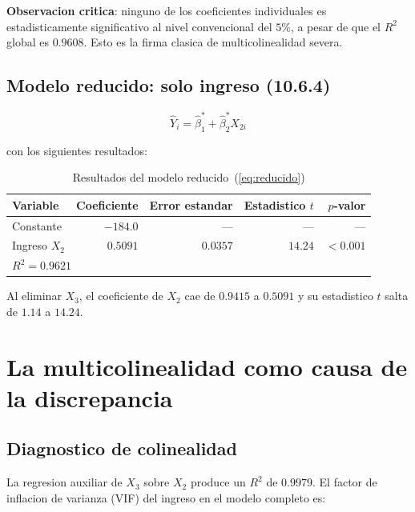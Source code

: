 \documentclass[12pt, letterpaper]{article}
\theoremstyle{remark}
\begin{document}
\noindent\textbf{Observacion critica}: ninguno de los coeficientes individuales
es estadisticamente significativo al nivel convencional del $5\%$, a pesar de
que el $R^2$ global es $0.9608$. Esto es la firma clasica de multicolinealidad
severa.

\subsection{Modelo reducido: solo ingreso (10.6.4)}

\begin{equation}
  \hat{Y}_i = \hat{\beta}_1^* + \hat{\beta}_2^* X_{2i}
  \label{eq:reducido}
\end{equation}

\noindent con los siguientes resultados:

\begin{table}[ht]
\centering
\caption{Resultados del modelo reducido~(\ref{eq:reducido})}
\label{tab:reducido}
\small
\begin{tabular}{lrrrr}
\toprule
\textbf{Variable} & \textbf{Coeficiente} & \textbf{Error estandar}
                  & \textbf{Estadistico $t$} & \textbf{$p$-valor} \\
\midrule
Constante         & $-184.0$  & ---      & ---     & ---    \\
Ingreso $X_2$     & $0.5091$  & $0.0357$ & $14.24$ & $< 0.001$ \\
\midrule
\multicolumn{2}{l}{$R^2 = 0.9621$} & \multicolumn{3}{l}{} \\
\bottomrule
\end{tabular}
\end{table}

\noindent Al eliminar $X_3$, el coeficiente de $X_2$ cae de $0.9415$ a
$0.5091$ y su estadistico $t$ salta de $1.14$ a $14.24$.

\section{La multicolinealidad como causa de la discrepancia}

\subsection{Diagnostico de colinealidad}

La regresion auxiliar de $X_3$ sobre $X_2$ produce un $R^2$ de $0.9979$.
El factor de inflacion de varianza (VIF) del ingreso en el modelo completo es:
\end{document}
